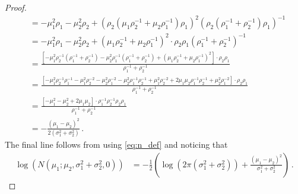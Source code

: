 \documentclass[a4paper]{article}
\begin{document}
\begin{proof}
\begin{align*}
                                                                                                            & = -\mu_1^2\rho_1 -\mu_2^2\rho_2 + \left(\rho_2\left(\mu_1\rho_2^{-1}+\mu_2\rho_1^{-1}\right)\rho_1\right)^2\left(\rho_2\left(\rho_1^{-1}+\rho_2^{-1}\right)\rho_1\right)^{-1}                                                        \\
                                                                                                            & = -\mu_1^2\rho_1 -\mu_2^2\rho_2 + \left(\mu_1\rho_2^{-1}+\mu_2\rho_1^{-1}\right)^2 \cdot \rho_2\rho_1\left(\rho_1^{-1}+\rho_2^{-1}\right)^{-1}                                                                                       \\
                                                                                                            & = \frac{\left[-\mu_1^2\rho_2^{-1}\left(\rho_1^{-1}+\rho_2^{-1}\right) -\mu_2^2\rho_1^{-1}\left(\rho_1^{-1}+\rho_2^{-1}\right) + \left(\mu_1\rho_2^{-1}+\mu_2\rho_1^{-1}\right)^2\right] \cdot \rho_2\rho_1}{\rho_1^{-1}+\rho_2^{-1}} \\
                                                                                                            & = \frac{\left[-\mu_1^2\rho_2^{-1}\rho_1^{-1}-\mu_1^2\rho_2^{-2} - \mu_2^2\rho_1^{-2} - \mu_2^2\rho_1^{-1}\rho_2^{-1} +
        \mu_1^2\rho_2^{-2} + 2\mu_1\mu_2\rho_1^{-1}\rho_2^{-1} + \mu_2^2\rho_1^{-2}\right] \cdot \rho_2\rho_1}{\rho_1^{-1}+\rho_2^{-1}}                                                                                                                                                                                                            \\
                                                                                                            & = \frac{\left[-\mu_1^2 - \mu_2^2 + 2\mu_1\mu_2\right] \cdot \rho_1^{-1}\rho_2^{-1}\rho_2\rho_1}{\rho_1^{-1}+\rho_2^{-1}}                                                                                                             \\
                                                                                                            & = -\frac{\left(\mu_1 - \mu_2 \right)^2}{2\left(\sigma_1^2 + \sigma_2^2\right)} \,.
    \end{align*}
    The final line follows from using \eqref{eq:n_def} and noticing that
    \begin{align*}
        \log\left(N\left(\mu_1;\mu_2,\sigma_1^2+\sigma_2^2,0\right)\right) & = - \frac{1}{2}\left(\log\left(2\pi \left(\sigma_1^2+\sigma_2^2\right)\right) + \frac{\left(\mu_1 - \mu_2\right)^2}{\sigma_1^2+\sigma_2^2}\right)\,.
    \end{align*}
\end{proof}
\end{document}
